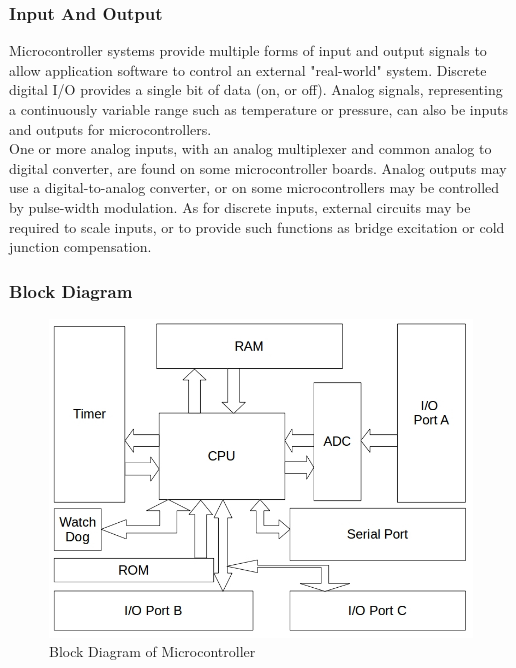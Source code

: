 \subsubsection{Input And Output}
Microcontroller systems provide multiple forms of input and output signals to allow application software to control an external "real-world" system. Discrete digital I/O provides a single bit of data (on, or off). Analog signals, representing a continuously variable range such as temperature or pressure, can also be inputs and outputs for microcontrollers.\\
One or more analog inputs, with an analog multiplexer and common analog to digital converter, are found on some microcontroller boards. Analog outputs may use a digital-to-analog converter, or on some microcontrollers may be controlled by pulse-width modulation. As for discrete inputs, external circuits may be required to scale inputs, or to provide such functions as bridge excitation or cold junction compensation.
\subsubsection{Block Diagram}
\begin{figure}[h]
\center
\includegraphics[scale=0.5]{microblock.jpg}  
\caption{Block Diagram of Microcontroller}
\end{figure}
